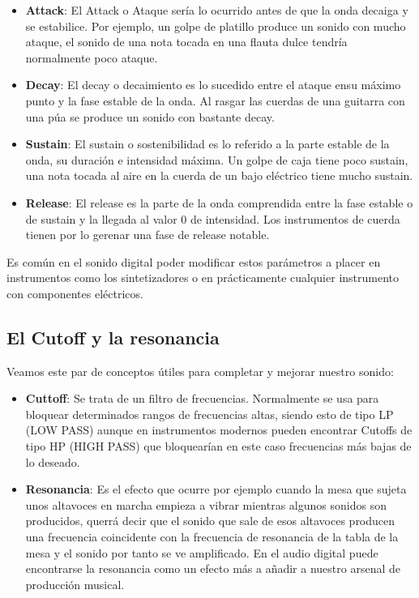 \begin{itemize}
    \item \textbf{Attack}: El Attack o Ataque sería lo ocurrido antes de que la onda decaiga y se estabilice. Por ejemplo, un golpe de platillo produce un sonido con mucho ataque, el sonido de una nota tocada en una flauta dulce tendría normalmente poco ataque.
    \item \textbf{Decay}: El decay o decaimiento es lo sucedido entre el ataque ensu máximo punto y la fase estable de la onda. Al rasgar las cuerdas de una guitarra con una púa se produce un sonido con bastante decay.
    \item \textbf{Sustain}: El sustain o sostenibilidad es lo referido a la parte estable de la onda, su duración e intensidad máxima. Un golpe de caja tiene poco sustain, una nota tocada al aire en la cuerda de un bajo eléctrico tiene mucho sustain.
    \item \textbf{Release}: El release es la parte de la onda comprendida entre la fase estable o de sustain y la llegada al valor 0 de intensidad. Los instrumentos de cuerda tienen por lo gerenar una fase de release notable.
\end{itemize}


Es común en el sonido digital poder modificar estos parámetros a placer en instrumentos como los sintetizadores o en prácticamente cualquier instrumento con componentes eléctricos.

\subsection{El Cutoff y la resonancia}\label{sec:Cutoff} 

Veamos este par de conceptos útiles para completar y mejorar nuestro sonido:

\begin{itemize}
    \item \textbf{Cuttoff}: Se trata de un filtro de frecuencias. Normalmente se usa para bloquear determinados rangos de frecuencias altas, siendo esto de tipo LP (LOW PASS) aunque en instrumentos modernos pueden encontrar Cutoffs de tipo HP (HIGH PASS) que bloquearían en este caso frecuencias más bajas de lo deseado.
    \item \textbf{Resonancia}: Es el efecto que ocurre por ejemplo cuando la mesa que sujeta unos altavoces en marcha empieza a vibrar mientras algunos sonidos son producidos, querrá decir que el sonido que sale de esos altavoces producen una frecuencia coincidente con la frecuencia de resonancia de la tabla de la mesa y el sonido por tanto se ve amplificado. En el audio digital puede encontrarse la resonancia como un efecto más a añadir a nuestro arsenal de producción musical. 
\end{itemize}


